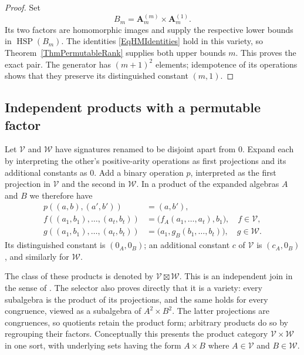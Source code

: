 \documentclass[12pt,english]{amsart}
\theoremstyle{definition}
\numberwithin{equation}{section}
\theoremstyle{remark}
\begin{document}
\begin{proof}
Set
\[
B_m=\mathbf A_m^{(m)}\times\mathbf A_m^{(1)}.
\]
Its two factors are homomorphic images and supply the respective
lower bounds in $\operatorname{HSP}(B_m)$.
The identities \eqref{EqHMIdentities} hold in this variety, so
Theorem~\ref{ThmPermutableRank} supplies both upper bounds $m$.
This proves the exact pair. The generator has $(m+1)^2$ elements;
idempotence of its operations shows that they preserve its
distinguished constant $(m,1)$.
\end{proof}

\subsection{Independent products with a permutable factor}\label{SubsecIndependentProducts}

Let $\mathcal V$ and $\mathcal W$ have signatures renamed to be
disjoint apart from $0$. Expand each by interpreting the other's
positive-arity operations as first projections and its additional
constants as $0$. Add a binary operation $p$, interpreted as the
first projection in $\mathcal V$ and the second in $\mathcal W$.
In a product of the expanded algebras $A$ and $B$ we therefore have
\begin{equation}\label{EqIndependentProductOperations}
\begin{aligned}
p((a,b),(a',b'))&=(a,b'),\\
f((a_1,b_1),\ldots,(a_t,b_t))
 &=\bigl(f_A(a_1,\ldots,a_t),b_1\bigr),\quad f\in\mathcal V,\\
g((a_1,b_1),\ldots,(a_t,b_t))
 &=\bigl(a_1,g_B(b_1,\ldots,b_t)\bigr),\quad g\in\mathcal W.
\end{aligned}
\end{equation}
Its distinguished constant is $(0_A,0_B)$; an additional constant
$c$ of $\mathcal V$ is $(c_A,0_B)$, and similarly for $\mathcal W$.

The class of these products is denoted by
$\mathcal V\boxtimes\mathcal W$. This is an independent join in
the sense of \cite[Theorem~1]{GLP69}. The selector also proves
directly that it is a variety: every subalgebra is the product of
its projections, and the same holds for every congruence, viewed
as a subalgebra of $A^2\times B^2$. The latter projections are
congruences, so quotients retain the product form; arbitrary
products do so by regrouping their factors. Conceptually this
presents the product category $\mathcal V\times\mathcal W$ in one
sort, with underlying sets having the form $A\times B$ where $A\in \mathcal V$ and $B\in \mathcal W$.
\end{document}
